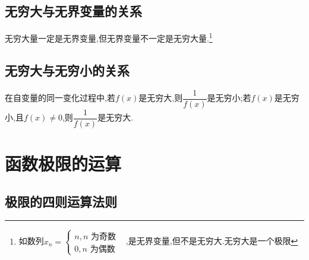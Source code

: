 \documentclass[10pt, a4paper, oneside, UTF8]{ctexbook}
\begin{document}
\begin{sloppypar}
    \subsection{无穷大与无界变量的关系}
    无穷大量一定是无界变量,但无界变量不一定是无穷大量.\footnote{如数列$x_n=\begin{cases}n,n\text{ 为奇数}\\0,n\text{ 为偶数}&\end{cases}$,是无界变量,但不是无穷大.无穷大是一个极限}
    \subsection{无穷大与无穷小的关系}
    在自变量的同一变化过程中,若$f(x)$是无穷大,则$\dfrac{1}{f(x)}$是无穷小;若$f(x)$是无穷小,且$f(x)\neq 0$,则$\dfrac{1}{f(x)}$是无穷大.
    \section{函数极限的运算}
    \subsection{极限的四则运算法则}\label{jxdsz1}

\end{sloppypar}
\end{document}
